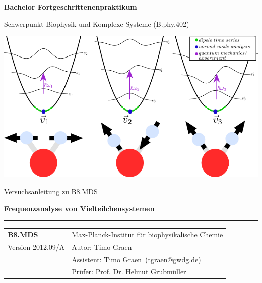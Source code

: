 \documentclass[a4paper,12pt]{article}
\begin{document}
\begin{center}
{\sffamily\bfseries\Huge Bachelor Fortgeschrittenenpraktikum}

{\sffamily\Large Schwerpunkt Biophysik und Komplexe Systeme (B.phy.402)}

\newcommand{\vk}{B8.MDS}
\newcommand{\vt}{Frequenzanalyse von Vielteilchensystemen}
\newcommand{\vv}{2012.09/A}
\newcommand{\vi}{Max-Planck-Institut für biophysikalische Chemie}
\newcommand{\va}{Timo Graen}

\vspace{\fill}

\includegraphics{oscillators.png}
\vspace{\fill}

{\sffamily\Large Versuchsanleitung zu \vk}

{\sffamily\bfseries\Huge
\vt\\}

\vspace{25mm}

\hrule
{\sffamily
\begin{tabular}{p{40mm}p{130mm}}
{\bfseries \vk} & \vi\\
Version \vv & Autor: \va\\
 & Assistent: \va \ (tgraen@gwdg.de)\\
 & Prüfer: Prof. Dr. Helmut Grubmüller
\end{tabular}

}

\end{center}
\newpage
\end{document}
